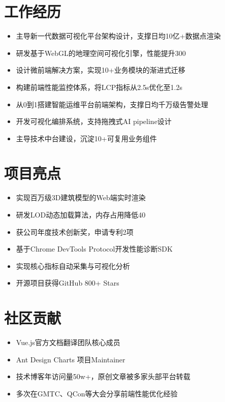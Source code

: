 \documentclass[11pt,a4paper]{resume}
\begin{document}
\section{ 工作经历}
\begin{itemize}[leftmargin=*]
  \item 主导新一代数据可视化平台架构设计，支撑日均10亿+数据点渲染
  \item 研发基于WebGL的地理空间可视化引擎，性能提升300%
  \item 设计微前端解决方案，实现10+业务模块的渐进式迁移
  \item 构建前端性能监控体系，将LCP指标从2.5s优化至1.2s
\end{itemize}

\begin{itemize}[leftmargin=*]
  \item 从0到1搭建智能运维平台前端架构，支撑日均千万级告警处理
  \item 开发可视化编排系统，支持拖拽式AI pipeline设计
  \item 主导技术中台建设，沉淀10+可复用业务组件
\end{itemize}

\section{ 项目亮点}
\begin{itemize}[leftmargin=*]
  \item 实现百万级3D建筑模型的Web端实时渲染
  \item 研发LOD动态加载算法，内存占用降低40%
  \item 获公司年度技术创新奖，申请专利2项
\end{itemize}

\begin{itemize}[leftmargin=*]
  \item 基于Chrome DevTools Protocol开发性能诊断SDK
  \item 实现核心指标自动采集与可视化分析
  \item 开源项目获得GitHub 800+ Stars
\end{itemize}

\section{ 社区贡献}
\begin{itemize}[leftmargin=*]
  \item Vue.js官方文档翻译团队核心成员
  \item Ant Design Charts 项目Maintainer
  \item 技术博客年访问量50w+，原创文章被多家头部平台转载
  \item 多次在GMTC、QCon等大会分享前端性能优化经验
\end{itemize}
\end{document}
